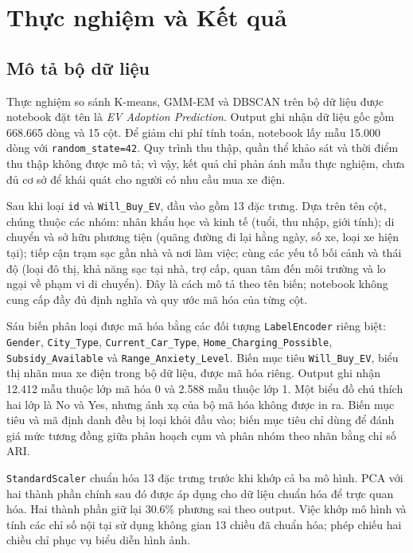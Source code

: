 \section{Thực nghiệm và Kết quả}
\label{sec:experiments}

\subsection{Mô tả bộ dữ liệu}
Thực nghiệm so sánh K-means, GMM-EM và DBSCAN trên bộ dữ liệu được notebook
đặt tên là \emph{EV Adoption Prediction}. Output ghi nhận dữ liệu gốc gồm
668.665 dòng và 15 cột. Để giảm chi phí tính toán, notebook lấy mẫu 15.000 dòng
với \texttt{random\_state=42}. Quy trình thu thập, quần thể khảo sát và thời
điểm thu thập không được mô tả; vì vậy, kết quả chỉ phản ánh mẫu thực nghiệm,
chưa đủ cơ sở để khái quát cho người có nhu cầu mua xe điện.

Sau khi loại \texttt{id} và \texttt{Will\_Buy\_EV}, đầu vào gồm 13 đặc trưng.
Dựa trên tên cột, chúng thuộc các nhóm: nhân khẩu học và kinh tế (tuổi,
thu nhập, giới tính); di chuyển và sở hữu phương tiện (quãng đường đi lại
hằng ngày, số xe, loại xe hiện tại); tiếp cận trạm sạc gần nhà và nơi làm
việc; cùng các yếu tố bối cảnh và thái độ (loại đô thị, khả năng sạc tại nhà,
trợ cấp, quan tâm đến môi trường và lo ngại về phạm vi di chuyển).
Đây là cách mô tả theo tên biến; notebook không cung cấp đầy đủ định nghĩa
và quy ước mã hóa của từng cột.

Sáu biến phân loại được mã hóa bằng các đối tượng \texttt{LabelEncoder}
riêng biệt: \texttt{Gender}, \texttt{City\_Type},
\texttt{Current\_Car\_Type}, \texttt{Home\_Charging\_Possible},
\texttt{Subsidy\_Available} và \texttt{Range\_Anxiety\_Level}.
Biến mục tiêu \texttt{Will\_Buy\_EV}, biểu thị nhãn mua xe điện trong bộ
dữ liệu, được mã hóa riêng. Output ghi nhận 12.412 mẫu thuộc lớp mã hóa 0
và 2.588 mẫu thuộc lớp 1. Một biểu đồ chú thích hai lớp là No và Yes,
nhưng ánh xạ của bộ mã hóa không được in ra. Biến mục tiêu và mã định danh
đều bị loại khỏi đầu vào; biến mục tiêu chỉ dùng để đánh giá mức tương đồng
giữa phân hoạch cụm và phân nhóm theo nhãn bằng chỉ số ARI.

\texttt{StandardScaler} chuẩn hóa 13 đặc trưng trước khi khớp cả ba mô hình.
PCA với hai thành phần chính sau đó được áp dụng cho dữ liệu chuẩn hóa
để trực quan hóa. Hai thành phần giữ lại 30.6\% phương sai theo output.
Việc khớp mô hình và tính các chỉ số nội tại sử dụng không gian 13 chiều
đã chuẩn hóa; phép chiếu hai chiều chỉ phục vụ biểu diễn hình ảnh.

